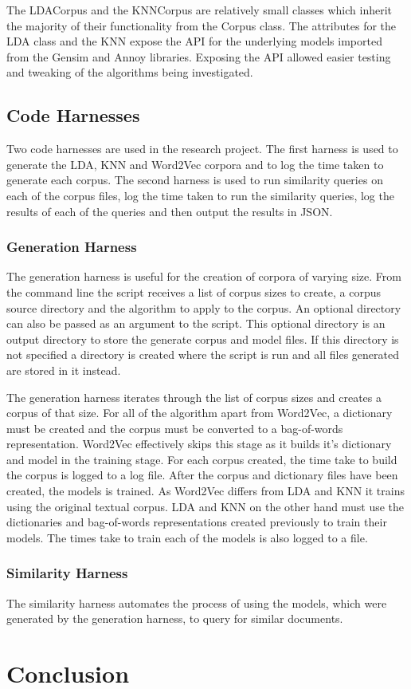 The LDACorpus and the KNNCorpus are relatively small classes which inherit the majority of their functionality from the Corpus class.
The attributes for the LDA class and the KNN expose the API for the underlying models imported from the Gensim and Annoy libraries.
Exposing the API allowed easier testing and tweaking of the algorithms being investigated.

\subsection{Code Harnesses}
Two code harnesses are used in the research project. The first harness is used to generate the LDA, KNN and Word2Vec corpora and to log the time taken to generate each corpus.
The second harness is used to run similarity queries on each of the corpus files, log the time taken to run the similarity queries, log the results of each of the queries and then output the results in JSON.

\subsubsection{Generation Harness}
The generation harness is useful for the creation of corpora of varying size.
From the command line the script receives a list of corpus sizes to create, a corpus source directory and the algorithm to apply to the corpus.
An optional directory can also be passed as an argument to the script.
This optional directory is an output directory to store the generate corpus and model files.
If this directory is not specified a directory is created where the script is run and all files generated are stored in it instead.

The generation harness iterates through the list of corpus sizes and creates a corpus of that size.
For all of the algorithm apart from Word2Vec, a dictionary must be created and the corpus must be converted to a bag-of-words representation.
Word2Vec effectively skips this stage as it builds it's dictionary and model in the training stage.
For each corpus created, the time take to build the corpus is logged to a log file.
After the corpus and dictionary files have been created, the models is trained.
As Word2Vec differs from LDA and KNN it trains using the original textual corpus.
LDA and KNN on the other hand must use the dictionaries and bag-of-words representations created previously to train their models.
The times take to train each of the models is also logged to a file.

\subsubsection{Similarity Harness}
The similarity harness automates the process of using the models, which were generated by the generation harness, to query for similar documents.


\section{Conclusion}
